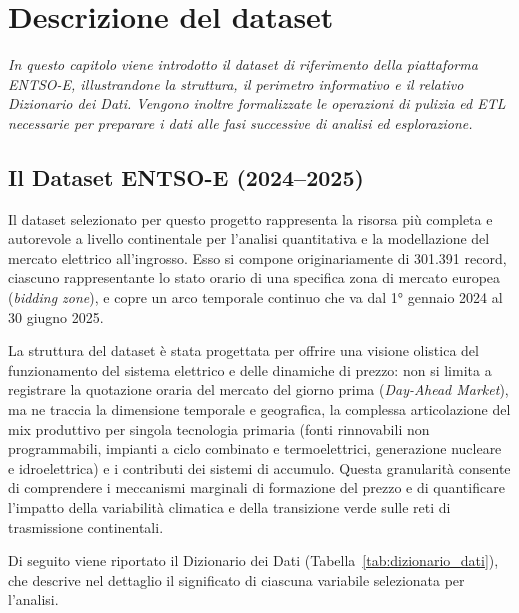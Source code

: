 \chapter{Descrizione del dataset} \label{cap:dataset}

\begin{preamble}
{\em In questo capitolo viene introdotto il dataset di riferimento della piattaforma ENTSO-E, illustrandone la struttura, il perimetro informativo e il relativo Dizionario dei Dati. Vengono inoltre formalizzate le operazioni di pulizia ed ETL necessarie per preparare i dati alle fasi successive di analisi ed esplorazione.}
\end{preamble}

\section{Il Dataset ENTSO-E (2024--2025)}
Il dataset selezionato per questo progetto rappresenta la risorsa più completa e autorevole a livello continentale per l’analisi quantitativa e la modellazione del mercato elettrico all'ingrosso. Esso si compone originariamente di 301.391 record, ciascuno rappresentante lo stato orario di una specifica zona di mercato europea (\textit{bidding zone}), e copre un arco temporale continuo che va dal 1° gennaio 2024 al 30 giugno 2025.

La struttura del dataset è stata progettata per offrire una visione olistica del funzionamento del sistema elettrico e delle dinamiche di prezzo: non si limita a registrare la quotazione oraria del mercato del giorno prima (\textit{Day-Ahead Market}), ma ne traccia la dimensione temporale e geografica, la complessa articolazione del mix produttivo per singola tecnologia primaria (fonti rinnovabili non programmabili, impianti a ciclo combinato e termoelettrici, generazione nucleare e idroelettrica) e i contributi dei sistemi di accumulo. Questa granularità consente di comprendere i meccanismi marginali di formazione del prezzo e di quantificare l'impatto della variabilità climatica e della transizione verde sulle reti di trasmissione continentali.

Di seguito viene riportato il Dizionario dei Dati (Tabella~\ref{tab:dizionario_dati}), che descrive nel dettaglio il significato di ciascuna variabile selezionata per l'analisi.

